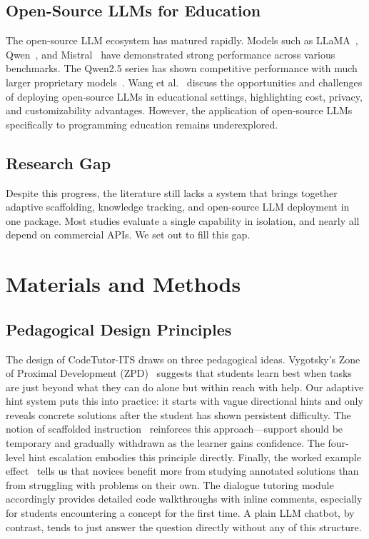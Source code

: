 \documentclass[journal,article,submit,pdftex,moreauthors]{Definitions/mdpi}
\begin{document}
\subsection{Open-Source LLMs for Education}

The open-source LLM ecosystem has matured rapidly. Models such as LLaMA~\cite{ref8}, Qwen~\cite{ref24}, and Mistral~\cite{ref25} have demonstrated strong performance across various benchmarks. The Qwen2.5 series has shown competitive performance with much larger proprietary models~\cite{ref24}. Wang et al.~\cite{ref26} discuss the opportunities and challenges of deploying open-source LLMs in educational settings, highlighting cost, privacy, and customizability advantages. However, the application of open-source LLMs specifically to programming education remains underexplored.

\subsection{Research Gap}

Despite this progress, the literature still lacks a system that brings together adaptive scaffolding, knowledge tracking, and open-source LLM deployment in one package. Most studies evaluate a single capability in isolation, and nearly all depend on commercial APIs. We set out to fill this gap.

\section{Materials and Methods}

\subsection{Pedagogical Design Principles}

The design of CodeTutor-ITS draws on three pedagogical ideas. Vygotsky's Zone of Proximal Development (ZPD)~\cite{ref27} suggests that students learn best when tasks are just beyond what they can do alone but within reach with help. Our adaptive hint system puts this into practice: it starts with vague directional hints and only reveals concrete solutions after the student has shown persistent difficulty. The notion of scaffolded instruction~\cite{ref28} reinforces this approach---support should be temporary and gradually withdrawn as the learner gains confidence. The four-level hint escalation embodies this principle directly. Finally, the worked example effect~\cite{ref29} tells us that novices benefit more from studying annotated solutions than from struggling with problems on their own. The dialogue tutoring module accordingly provides detailed code walkthroughs with inline comments, especially for students encountering a concept for the first time. A plain LLM chatbot, by contrast, tends to just answer the question directly without any of this structure.
\end{document}
